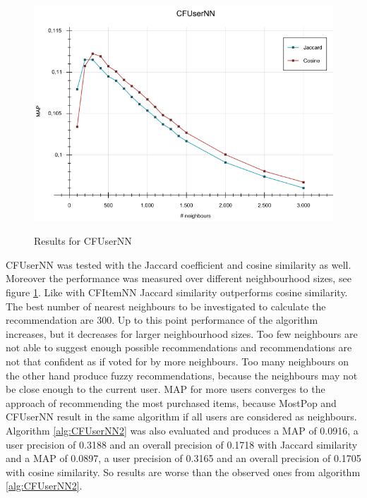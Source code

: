 \documentclass[10pt]{reportMaster}
\begin{document}
\begin{figure}
	\caption{Results for CFUserNN}
	\centering
	\includegraphics[width=1\textwidth]{figures/experiments/CFUserNN}
	\label{fig:CFUserNN}
\end{figure}

CFUserNN was tested with the Jaccard coefficient and cosine similarity as well.
Moreover the performance was measured over different neighbourhood sizes, see figure \ref{fig:CFUserNN}.
Like with CFItemNN Jaccard similarity outperforms cosine similarity.
The best number of nearest neighbours to be investigated to calculate the recommendation are 300.
Up to this point performance of the algorithm increases, but it decreases for larger neighbourhood sizes.
Too few neighbours are not able to suggest enough possible recommendations and recommendations are not that confident as if voted for by more neighbours.
Too many neighbours on the other hand produce fuzzy recommendations, because the neighbours may not be close enough to the current user.
MAP for more users converges to the approach of recommending the most purchased items, because MostPop and CFUserNN result in the same algorithm if all users are considered as neighbours.
Algorithm \ref{alg:CFUserNN2} was also evaluated and produces a MAP of 0.0916, a user precision of 0.3188 and an overall precision of 0.1718 with Jaccard similarity and a MAP of 0.0897, a user precision of 0.3165 and an overall precision of 0.1705 with cosine similarity.
So results are worse than the observed ones from algorithm \ref{alg:CFUserNN2}.
\end{document}
